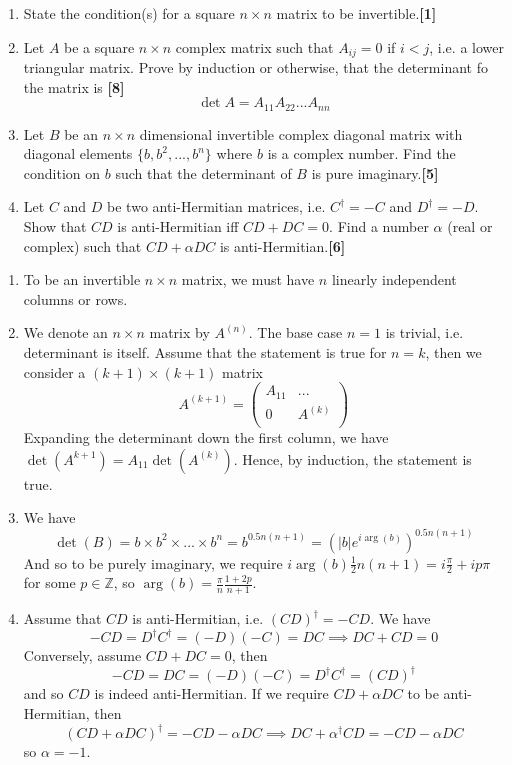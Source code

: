 \documentclass[a4paper]{article}
\begin{document}
\newpage
\begin{qns}\leavevmode
\begin{enumerate}[label=(\alph*)]
\item State the condition(s) for a square $n\times n$ matrix to be invertible.\hfill \textbf{[1]}
\item Let $A$ be a square $n\times n$ complex matrix such that $A_{ij}=0$ if $i<j$, i.e. a lower triangular matrix. Prove by induction or otherwise, that the determinant fo the matrix is \hfill \textbf{[8]} 
$$\det A=A_{11}A_{22}...A_{nn}$$
\item Let $B$ be an $n\times n$ dimensional invertible complex diagonal matrix with diagonal elements $\{b,b^2,...,b^n\}$ where $b$ is a complex number. Find the condition on $b$ such that the determinant of $B$ is pure imaginary.\hfill \textbf{[5]}
\item Let $C$ and $D$ be two anti-Hermitian matrices, i.e. $C^\dag=-C$ and $D^\dag=-D$. Show that $CD$ is anti-Hermitian iff $CD+DC=0$. Find a number $\alpha$ (real or complex) such that $CD+\alpha DC$ is anti-Hermitian.\hfill \textbf{[6]}
\end{enumerate}
\end{qns}
\begin{ans}\leavevmode
\begin{enumerate}[label=(\alph*)]
\item To be an invertible $n\times n$ matrix, we must have $n$ linearly independent columns or rows.
\item We denote an $n\times n$ matrix by $A^{(n)}$. The base case $n=1$ is trivial, i.e. determinant is itself. Assume that the statement is true for $n=k$, then we consider a $(k+1)\times(k+1)$ matrix
$$A^{(k+1)}=\begin{pmatrix}A_{11}&...\\0&A^{(k)}\\\end{pmatrix}$$
Expanding the determinant down the first column, we have $\det(A^{k+1})=A_{11}\det(A^{(k)})$. Hence, by induction, the statement is true.
\item We have 
$$\det(B)=b\times b^2\times...\times b^n=b^{0.5n(n+1)}=(|b|e^{i\arg(b)})^{0.5n(n+1)}$$
And so to be purely imaginary, we require $i\arg(b)\frac{1}{2}n(n+1)=i\frac{\pi}{2}+ip\pi$ for some $p\in\mathbb{Z}$, so $\arg(b)=\frac{\pi}{n}\frac{1+2p}{n+1}$.
\item Assume that $CD$ is anti-Hermitian, i.e. $(CD)^\dag=-CD$. We have 
$$-CD=D^\dag C^\dag=(-D)(-C)=DC\implies DC+CD=0$$
Conversely, assume $CD+DC=0$, then
$$-CD=DC=(-D)(-C)=D^\dag C^\dag=(CD)^\dag$$
and so $CD$ is indeed anti-Hermitian. If we require $CD+\alpha DC$ to be anti-Hermitian, then
$$(CD+\alpha DC)^\dag=-CD-\alpha DC\implies DC+\alpha^\dag CD=-CD-\alpha DC$$
so $\alpha=-1$.
\end{enumerate}
\end{ans}
\end{document}
